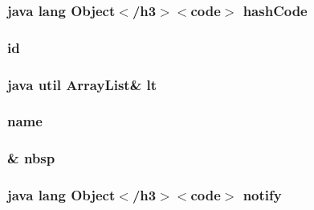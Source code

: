 \hypertarget{_station_8html_a8e178e2bb2bef055ea23ea3910a221ca}{
\subsubsection[{hash\-Code}]{\setlength{\rightskip}{0pt plus 5cm}java lang Object$<$/h3$>$$<$code$>$ hash\-Code}}\label{_station_8html_a8e178e2bb2bef055ea23ea3910a221ca}
\hypertarget{_station_8html_acf2488b95c97e0378c9bf49de3b50f28}{
\subsubsection[{id}]{\setlength{\rightskip}{0pt plus 5cm}id}}\label{_station_8html_acf2488b95c97e0378c9bf49de3b50f28}
\hypertarget{_station_8html_a6046ea68583de5557b637104e82142fd}{
\subsubsection[{lt}]{\setlength{\rightskip}{0pt plus 5cm}java util Array\-List\& lt}}\label{_station_8html_a6046ea68583de5557b637104e82142fd}
\hypertarget{_station_8html_ab74e6bf80237ddc4109968cedc58c151}{
\subsubsection[{name}]{\setlength{\rightskip}{0pt plus 5cm}name}}\label{_station_8html_ab74e6bf80237ddc4109968cedc58c151}
\hypertarget{_station_8html_aef915316f784c9063d942974538301a6}{
\subsubsection[{nbsp}]{\setlength{\rightskip}{0pt plus 5cm}\& nbsp}}\label{_station_8html_aef915316f784c9063d942974538301a6}
\hypertarget{_station_8html_ae99ae10b5010594dbda4794e02db271b}{
\subsubsection[{notify}]{\setlength{\rightskip}{0pt plus 5cm}java lang Object$<$/h3$>$$<$code$>$ notify}}\label{_station_8html_ae99ae10b5010594dbda4794e02db271b}
